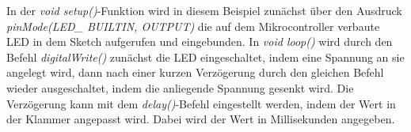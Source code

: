 In der \textit{void setup()}-Funktion wird in diesem Beispiel zunächst über den Ausdruck \textit{pinMode(LED\_ BUILTIN, OUTPUT)} die auf dem Mikrocontroller verbaute LED in dem Sketch aufgerufen und eingebunden.
In \textit{void loop()} wird durch den Befehl \textit{digitalWrite()} zunächst die LED eingeschaltet, indem eine Spannung an sie angelegt wird, dann nach einer kurzen Verzögerung durch den gleichen Befehl wieder ausgeschaltet, indem die anliegende Spannung gesenkt wird. Die Verzögerung kann mit dem \textit{delay()}-Befehl eingestellt werden, indem der Wert in der Klammer angepasst wird. Dabei wird der Wert in Millisekunden angegeben.
